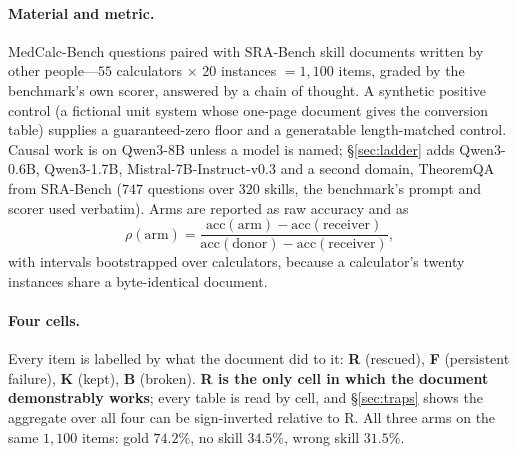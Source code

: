 \documentclass{article}
\begin{document}
\paragraph{Material and metric.} MedCalc-Bench questions \citep{khandekar2024medcalc}
paired with SRA-Bench skill documents \citep{su2026srabench} written by other people---$55$ calculators $\times$ $20$
instances $=1{,}100$ items, graded by the benchmark's own scorer, answered by a
chain of thought. A synthetic positive control (a fictional unit system whose
one-page document gives the conversion table) supplies a guaranteed-zero floor
and a generatable length-matched control. Causal work is on Qwen3-8B \citep{yang2025qwen3} unless a
model is named; \S\ref{sec:ladder} adds Qwen3-0.6B, Qwen3-1.7B,
Mistral-7B-Instruct-v0.3 \citep{jiang2023mistral} and a second domain,
TheoremQA from SRA-Bench ($747$ questions over $320$ skills, the benchmark's
prompt and scorer used verbatim). Arms are
reported as raw accuracy and as
\begin{equation}
\rho(\text{arm}) =
\frac{\text{acc}(\text{arm}) - \text{acc}(\text{receiver})}
     {\text{acc}(\text{donor}) - \text{acc}(\text{receiver})},
\label{eq:rho}
\end{equation}
with intervals bootstrapped over calculators, because a calculator's twenty
instances share a byte-identical document.

\paragraph{Four cells.}
\label{sec:cells}
Every item is labelled by what the document did to it: \textbf{R} (rescued),
\textbf{F} (persistent failure), \textbf{K} (kept), \textbf{B} (broken).
\textbf{R is the only cell in which the document demonstrably works}; every
table is read by cell, and \S\ref{sec:traps} shows the aggregate over all four
can be sign-inverted relative to R. All three arms on the same $1{,}100$ items:
gold $74.2\%$, no skill $34.5\%$, wrong skill $31.5\%$.
\end{document}
